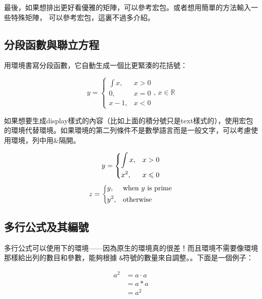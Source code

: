 最後，如果想排出更好看優雅的矩陣，可以參考宏包。或者想用簡單的方法輸入一些特殊矩陣， 可以參考宏包，這裏不過多介紹。

\subsection{分段函數與聯立方程}
用環境書寫分段函數，它自動生成一個比更緊湊的花括號：

\begin{codeshow}
\[y=\begin{cases}
\int x, & x>0 \\
0,   & x=0 \\
x-1, & x<0
\end{cases},\,x\in\mathbb{R}\]
\end{codeshow}

如果想要生成display樣式的內容（比如上面的積分號只是text樣式的），使用宏包的環境代替環境。如果環境的第二列條件不是數學語言而是一般文字，可以考慮使用環境，列中用\&{}隔開。

\begin{codeshow}
\[y=\begin{dcases}
  \int x, & x>0 \\
  x^2, & x\leqslant 0
  \end{dcases}\]
\[z=\begin{dcases*}
  y, & when $y$ is prime\\
  y^2, & otherwise
  \end{dcases*}\]
\end{codeshow}

\subsection{多行公式及其編號}
\label{subsec:multieqnum}
多行公式可以使用下的環境——因為原生的環境真的很差！而且環境不需要像環境那樣給出列的數目和參數，能夠根據
\texttt{\&}符號的數量來自調整。。下面是一個例子：

\begin{codeshow}
\begin{align}
  a^2  &= a\cdot a \\
       &= a*a      \\
       &= a^2
\end{align}
\end{codeshow}

